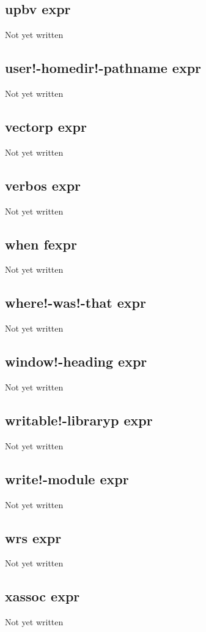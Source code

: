 \documentclass[a4paper,11pt]{article}
\begin{document}
\subsection{\ttfamily upbv expr}
Not yet written

\subsection{\ttfamily user!-homedir!-pathname expr}
Not yet written

\subsection{\ttfamily vectorp expr}
Not yet written

\subsection{\ttfamily verbos expr}
Not yet written

\subsection{\ttfamily when fexpr}
Not yet written

\subsection{\ttfamily where!-was!-that expr}
Not yet written

\subsection{\ttfamily window!-heading expr}
Not yet written

\subsection{\ttfamily writable!-libraryp expr}
Not yet written

\subsection{\ttfamily write!-module expr}
Not yet written

\subsection{\ttfamily wrs expr}
Not yet written

\subsection{\ttfamily xassoc expr}
Not yet written
\end{document}
